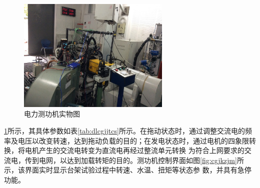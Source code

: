 \begin{figure}[H]
	\centering
	\includegraphics[width=0.65\textwidth]{thesis_figure/platformer_chapter/dlcgjswt}
	\caption{电力测功机实物图}
	\label{fig:dlcgjswt}
\end{figure}
\ref{fig:dlcgjswt}所示，其具体参数如表\ref{tab:dlcgjjtcs}所示。在拖动状态时，通过调整交流电的频率及电压以改变转速，达到拖动负载的目的；在发电状态时，通过电机的四象限转换，将电机产生的交流电转变为直流电再经过整流单元转换
为符合上网要求的交流电，传到电网，以达到加载转矩的目的。测功机控制界面如图\ref{fig:cgjkzjm}所示，该界面实时显示台架试验过程中转速、水温、扭矩等状态参
数，并具有急停功能。
